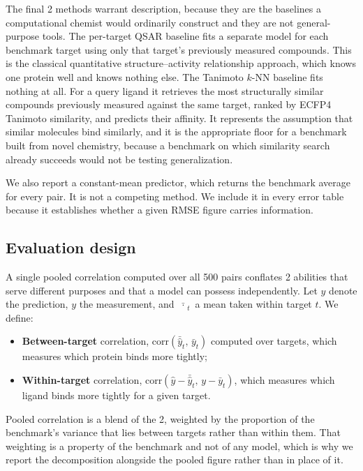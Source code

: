 \documentclass[11pt]{article}
\begin{document}
The final 2 methods warrant description, because they are the baselines a
computational chemist would ordinarily construct and they are not
general-purpose tools. The per-target QSAR baseline fits a separate model for
each benchmark target using only that target's previously measured compounds.
This is the classical quantitative structure--activity relationship approach,
which knows one protein well and knows nothing else. The Tanimoto $k$-NN
baseline fits nothing at all. For a query ligand it retrieves the most
structurally similar compounds previously measured against the same target,
ranked by ECFP4 Tanimoto similarity, and predicts their affinity. It represents
the assumption that similar molecules bind similarly, and it is the appropriate
floor for a benchmark built from novel chemistry, because a benchmark on which
similarity search already succeeds would not be testing generalization.

We also report a constant-mean predictor, which returns the benchmark average
for every pair. It is not a competing method. We include it in every error
table because it establishes whether a given RMSE figure carries information.

\subsection{Evaluation design}
\label{sec:eval-methods}

A single pooled correlation computed over all 500 pairs conflates 2 abilities
that serve different purposes and that a model can possess independently. Let
$\hat{y}$ denote the prediction, $y$ the measurement, and $\bar{\;\cdot\;}_t$ a
mean taken within target $t$. We define:

\begin{itemize}
  \item \textbf{Between-target} correlation,
        $\mathrm{corr}(\bar{\hat{y}}_t,\, \bar{y}_t)$ computed over targets,
        which measures which protein binds more tightly;
  \item \textbf{Within-target} correlation,
        $\mathrm{corr}(\hat{y} - \bar{\hat{y}}_t,\, y - \bar{y}_t)$, which
        measures which ligand binds more tightly for a given target.
\end{itemize}

Pooled correlation is a blend of the 2, weighted by the proportion of the
benchmark's variance that lies between targets rather than within them. That
weighting is a property of the benchmark and not of any model, which is why we
report the decomposition alongside the pooled figure rather than in place of
it.
\end{document}
